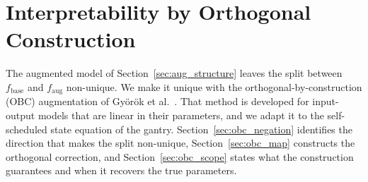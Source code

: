 \section{Interpretability by Orthogonal Construction}\label{sec:obc}

The augmented model of Section~\ref{sec:aug_structure} leaves the split between
$f_{\mathrm{base}}$ and $f_{\mathrm{aug}}$ non-unique.
We make it unique with the orthogonal-by-construction (OBC) augmentation of
Gy\"or\"ok et al.~\cite{gyorok2026obc}.
That method is developed for input-output models that are linear in their
parameters, and we adapt it to the self-scheduled state equation of the gantry.
Section~\ref{sec:obc_negation} identifies the direction that makes the split
non-unique, Section~\ref{sec:obc_map} constructs the orthogonal correction, and
Section~\ref{sec:obc_scope} states what the construction guarantees and when it
recovers the true parameters.

